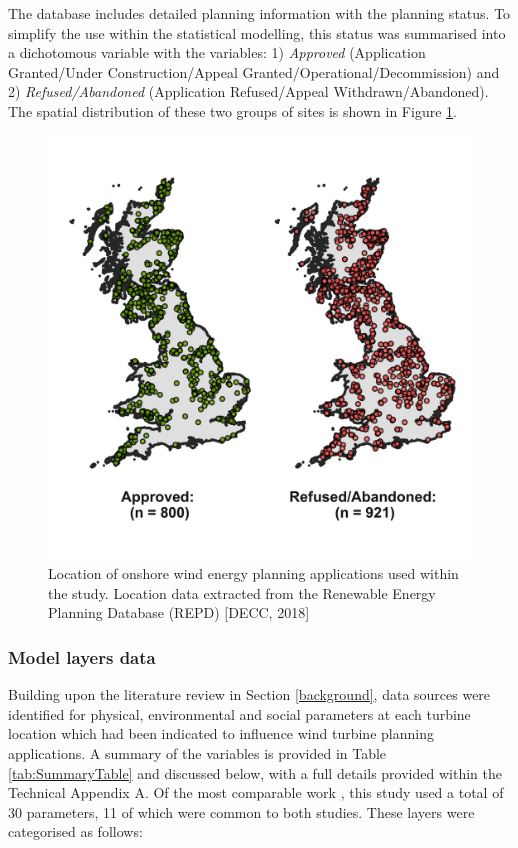 \documentclass[a4paper,]{article}
\theoremstyle{definition}
\theoremstyle{definition}
\theoremstyle{definition}
\theoremstyle{remark}
\begin{document}
The database includes detailed planning information with the planning status. To simplify the use within the statistical modelling, this status was summarised into a dichotomous variable with the variables: 1) \emph{Approved} (Application Granted/Under Construction/Appeal Granted/Operational/Decommission) and 2) \emph{Refused/Abandoned} (Application Refused/Appeal Withdrawn/Abandoned). The spatial distribution of these two groups of sites is shown in Figure \ref{fig:StudyExtent}.

\begin{figure}[h]

{\centering \includegraphics[width=0.5\linewidth]{figures/figure6} 

}

\caption{Location of onshore wind energy planning applications used within the study. Location data extracted from the Renewable Energy Planning Database (REPD) [DECC, 2018]}\label{fig:StudyExtent}
\end{figure}

\hypertarget{model-layers-data}{%
\subsubsection{Model layers data}\label{model-layers-data}}

Building upon the literature review in Section \ref{background}, data sources were identified for physical, environmental and social parameters at each turbine location which had been indicated to influence wind turbine planning applications. A summary of the variables is provided in Table \ref{tab:SummaryTable} and discussed below, with a full details provided within the Technical Appendix A. Of the most comparable work \citep{Roddis2018}, this study used a total of 30 parameters, 11 of which were common to both studies. These layers were categorised as follows:
\end{document}
